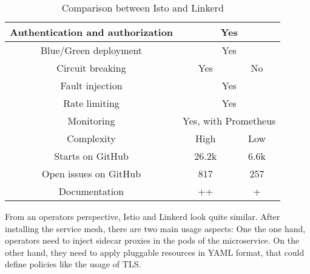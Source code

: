 \begin{table}
\begin{tabular*}{\columnwidth}{c|c|c}
Authentication and authorization & \multicolumn{2}{c}{Yes}                                                                                                          \\\hline
Blue/Green deployment            & \multicolumn{2}{c}{Yes}                                                                                                          \\\hline
Circuit breaking                 & Yes                                                                                                                & No          \\\hline
Fault injection                  & \multicolumn{2}{c}{Yes}                                                                                                          \\\hline
Rate limiting                    & \multicolumn{2}{c}{Yes}                                                                                                          \\\hline
Monitoring                       & \multicolumn{2}{c}{Yes, with Prometheus}                                                                                         \\\hline
Complexity                       & High                                                                                                               & Low         \\\hline
Starts on GitHub \cite{linkerd-github} \cite{istio-github}              & 26.2k & 6.6k        \\\hline
Open issues on GitHub \cite{linkerd-github} \cite{istio-github}                 & 817                                                                                                                & 257         \\\hline
Documentation                    & ++                                                                                                                 & +          
\end{tabular*}
\vspace{0.25mm}
\caption{Comparison between Isto and Linkerd}
\label{tab:istio-linkerd}
\end{table}


%
%
%
%

From an operators perspective, Istio and Linkerd look quite similar. After installing the service mesh, there are two main usage aspects: One the one hand, operators need to inject sidecar proxies in the pods of the microservice. On the other hand, they need to apply pluggable resources in YAML format, that could define policies like the usage of TLS.

